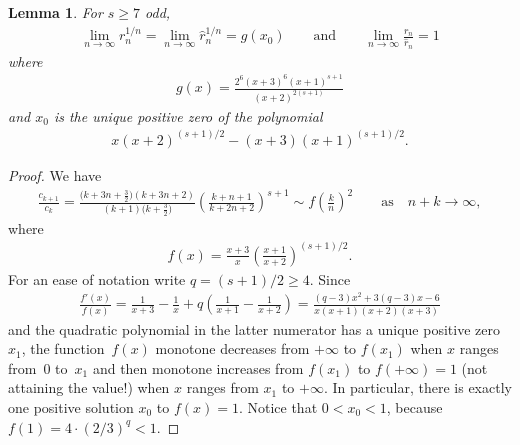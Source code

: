 \documentclass[11pt]{article}
\newtheorem{lemma}{Lemma}
\begin{document}
\begin{lemma}\label{l4} For $s\ge7$ odd,
\begin{gather*}
\lim_{n\to\infty}r_n^{1/n}=\lim_{n\to\infty}\hat r_n^{1/n}=g(x_0)
\qquad\text{and}\qquad \lim_{n\to\infty}\frac{r_n}{\hat r_n}=1
\end{gather*}
where
\begin{gather*}
g(x)=\frac{2^6(x+3)^6(x+1)^{s+1}}{(x+2)^{2(s+1)}}
\end{gather*}
and $x_0$ is the unique positive zero of the polynomial
\begin{gather*}
x(x+2)^{(s+1)/2}-(x+3)(x+1)^{(s+1)/2}.
\end{gather*}
\end{lemma}

\begin{proof}We have
\begin{gather}
\frac{c_{k+1}}{c_k} =\frac{\big(k+3n+\frac32\big)(k+3n+2)}{(k+1)\big(k+\frac32\big)} \left(\frac{k+n+1}{k+2n+2}\right)^{s+1} \sim f\left(\frac kn\right)^2 \qquad\text{as}\quad n+k\to\infty, \label{e11}
\end{gather}
where
\begin{gather*}
f(x)=\frac{x+3}{x}\left(\frac{x+1}{x+2}\right)^{(s+1)/2}.
\end{gather*}
For an ease of notation write $q=(s+1)/2\ge4$. Since
\begin{gather*}
\frac{f'(x)}{f(x)}=\frac1{x+3}-\frac1x+q\left(\frac1{x+1}-\frac1{x+2}\right) =\frac{(q-3)x^2+3(q-3)x-6}{x(x+1)(x+2)(x+3)}
\end{gather*}
and the quadratic polynomial in the latter numerator has a unique positive zero $x_1$, the func\-tion~$f(x)$ monotone decreases from $+\infty$ to $f(x_1)$ when $x$ ranges from~$0$ to~$x_1$ and then monotone increases from $f(x_1)$ to $f(+\infty)=1$ (not attaining the value!) when $x$ ranges from $x_1$ to $+\infty$. In particular, there is exactly one positive solution $x_0$ to $f(x)=1$. Notice that $0<x_0<1$, because $f(1)=4\cdot(2/3)^q<1$.


\end{proof}
\end{document}
